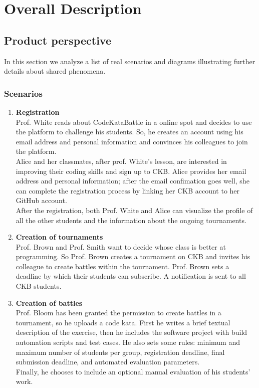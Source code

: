 \chapter{Overall Description}

\section{Product perspective}
In this section we analyze a list of real 
scenarios and diagrams illustrating further details about shared phenomena.

\subsection{Scenarios}
\begin{enumerate}
    \item \textbf{Registration} \\
    Prof. White reads about CodeKataBattle in a online spot and decides to use the platform to 
    challenge his students. So, he creates an account using his email address and personal information 
    and convinces his colleagues to join the platform.\\
    Alice and her classmates, after prof. White's lesson, are interested in improving their coding 
    skills and sign up to CKB. Alice provides her email address and personal information; after the email 
    confimation goes well, 
    she can complete the registration process by linking her CKB account to her GitHub account.\\
    After the registration, both Prof. White and Alice can visualize the profile of all the other 
    students and the information about the ongoing tournaments.

    \item \textbf{Creation of tournaments} \\
    Prof. Brown and Prof. Smith want to decide whose class is better at programming. So Prof. Brown 
    creates a tournament on CKB and invites his colleague to create battles within the tournament. Prof. Brown 
    sets a deadline by which their students can subscribe. A notification is sent to all CKB students.
    
    \item \textbf{Creation of battles} \\
    Prof. Bloom has been granted the permission to create battles in a tournament, so he uploads a 
    code kata. First he writes a brief textual description of the exercise, then he includes 
    the software project with build automation scripts and test cases. He also sets some rules: 
    minimum and maximum number of students per group, registration deadline, final submission deadline, and
    automated evaluation parameters.\\
    Finally, he chooses to include an optional manual evaluation of his students' work.


\end{enumerate}

